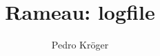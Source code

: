 \documentclass[12pt,brazil]{article}
\title{Rameau: logfile}
\author{Pedro Kröger}
\begin{document}
\graphicspath{{figs/}}

\maketitle
\end{document}
